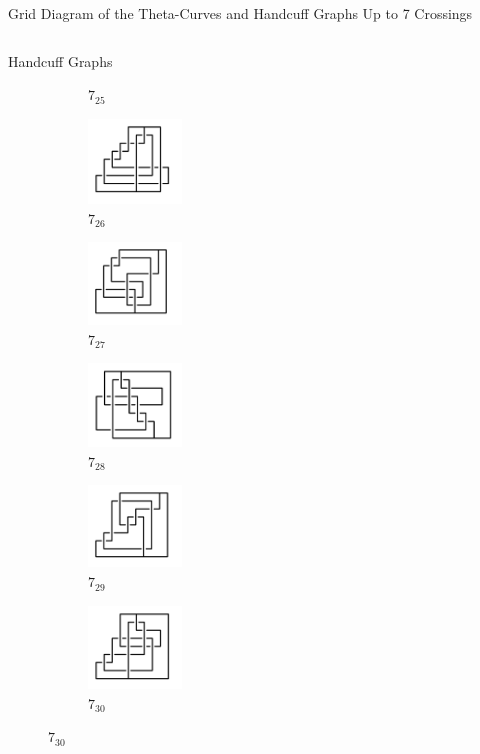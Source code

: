 \documentclass[final]{beamer}
\begin{document}
\begin{frame}[t]
\begin{alertblock}{Grid Diagram of the Theta-Curves and Handcuff Graphs Up to 7 Crossings}
\begin{columns}[t]
\begin{column}{0.3\textwidth}
\begin{alertblock}{Handcuff Graphs}
\begin{figure}
\begin{subfigure}{0.15\textwidth}
    \caption{$7_{25}$} 
    \end{subfigure}
    \begin{subfigure}{0.15\textwidth}
    \includegraphics[width=2.5cm]{../Midterm_Poster/grid_diagram/handcuff_7_26.png}
    \caption{$7_{26}$} 
    \end{subfigure}
    \begin{subfigure}{0.15\textwidth}
    \includegraphics[width=2.5cm]{../Midterm_Poster/grid_diagram/handcuff_7_27.png}
    \caption{$7_{27}$} 
    \end{subfigure}
    \begin{subfigure}{0.15\textwidth}
    \includegraphics[width=2.5cm]{../Midterm_Poster/grid_diagram/handcuff_7_28.png}
    \caption{$7_{28}$} 
    \end{subfigure}
    \begin{subfigure}{0.15\textwidth}
    \includegraphics[width=2.5cm]{../Midterm_Poster/grid_diagram/handcuff_7_29.png}
    \caption{$7_{29}$} 
    \end{subfigure}
    \begin{subfigure}{0.15\textwidth}
    \includegraphics[width=2.5cm]{../Midterm_Poster/grid_diagram/handcuff_7_30.png}
    \caption{$7_{30}$} 
    \end{subfigure}

\end{figure}
\end{alertblock}
\end{column}
\end{columns}
\end{alertblock}
\end{frame}
\end{document}
